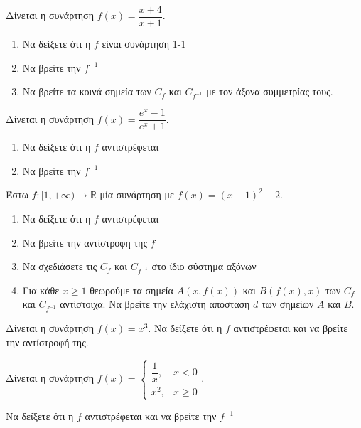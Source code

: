 \documentclass{presentation}
\begin{document}
\begin{askisi}
  Δίνεται η συνάρτηση $f(x)=\dfrac{x+4}{x+1}$.
  \begin{enumerate}[<+->]
    \item Να δείξετε ότι η $f$ είναι συνάρτηση 1-1
    \item Να βρείτε την $f^{-1}$
    \item Να βρείτε τα κοινά σημεία των $C_f$ και $C_{f^{-1}}$ με τον άξονα συμμετρίας τους.
  \end{enumerate}
\end{askisi}

\begin{askisi}
  Δίνεται η συνάρτηση $f(x)=\dfrac{e^x-1}{e^x+1}$.
  \begin{enumerate}[<+->]
    \item Να δείξετε ότι η $f$ αντιστρέφεται
    \item Να βρείτε την $f^{-1}$
  \end{enumerate}
\end{askisi}

\begin{askisi}
  Έστω $f:[1,+\infty)\to \mathbb{R}$ μία συνάρτηση με $f(x)=(x-1)^2+2$.
  \begin{enumerate}[<+->]
    \item Να δείξετε ότι η $f$ αντιστρέφεται
    \item Να βρείτε την αντίστροφη της $f$
    \item Να σχεδιάσετε τις $C_f$ και $C_{f^{-1}}$ στο ίδιο σύστημα αξόνων
    \item Για κάθε $x\ge 1$ θεωρούμε τα σημεία $Α(x,f(x))$ και $Β(f(x),x)$ των $C_f$ και $C_{f^{-1}}$ αντίστοιχα. Να βρείτε την ελάχιστη απόσταση $d$ των σημείων $Α$ και $Β$.
  \end{enumerate}
\end{askisi}

\begin{askisi}
  Δίνεται η συνάρτηση $f(x)=x^3$. Να δείξετε ότι η $f$ αντιστρέφεται και να βρείτε την αντίστροφή της.
\end{askisi}

\begin{askisi}
  Δίνεται η συνάρτηση $f(x)=\begin{cases}
      \dfrac{1}{x}, & x<0    \\
      x^2,          & x\ge 0
    \end{cases}$.

  Να δείξετε ότι η $f$ αντιστρέφεται και να βρείτε την $f^{-1}$
\end{askisi}
\end{document}
